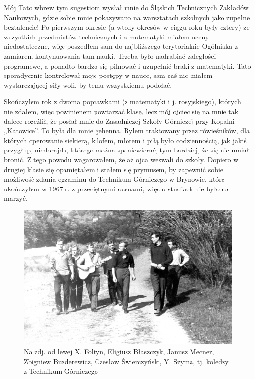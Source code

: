 Mój Tato wbrew tym sugestiom wysłał mnie do Śląskich Technicznych Zakładów Naukowych, gdzie sobie mnie pokazywano na warsztatach szkolnych jako zupełne beztalencie! Po pierwszym okresie (a wtedy okresów w ciągu roku były cztery) ze wszystkich przedmiotów technicznych i z matematyki miałem oceny niedostateczne, więc poszedłem sam do najbliższego terytorialnie Ogólniaka z zamiarem kontynuowania tam nauki. Trzeba było nadrabiać zaległości programowe, a ponadto bardzo się pilnować i uzupełnić braki z matematyki. Tato sporadycznie kontrolował moje postępy w nauce, sam zaś nie miałem wystarczającej siły woli, by temu wszystkiemu podołać.

Skończyłem rok z dwoma poprawkami (z matematyki i j. rosyjskiego), których nie zdałem, więc powinienem powtarzać klasę, lecz mój ojciec się na mnie tak dalece rozeźlił, że posłał mnie do Zasadniczej Szkoły Górniczej przy Kopalni „Katowice”. To była dla mnie gehenna. Byłem traktowany przez rówieśników, dla których operowanie siekierą, kilofem, młotem i piłą było codziennością, jak jakiś przygłup, niedorajda, którego można sponiewierać, tym bardziej, że się nie umiał bronić. Z tego powodu wagarowałem, że aż ojca wezwali do szkoły. Dopiero w drugiej klasie się opamiętałem i stałem się prymusem, by zapewnić sobie możliwość zdania egzaminu do Technikum Górniczego w Brynowie, które ukończyłem w 1967 r. z przeciętnymi ocenami, więc o studiach nie było co marzyć.
\begin{figure}[!h]
\begin{center}
\includegraphics[width=\textwidth]{photo/czeslaw_swierczynski_z_kolegami.jpg}
\caption[Czesław Świerczyński z kolegami]{Na zdj. od lewej X. Foltyn, Eligiusz Błaszczyk, Janusz Mecner, Zbigniew Buzderewicz, Czesław Świerczyński, Y. Szyma, tj.  koledzy z Technikum Górniczego}
\end{center}
\end{figure}

